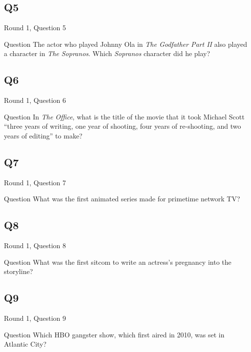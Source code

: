 \documentclass[11pt]{beamer}
\begin{document}
\subsection*{Q5}
\begin{frame}[t]{Round 1, Question 5}
\begin{block}{Question}
The actor who played Johnny Ola in \emph{The Godfather Part II} also played a character in \emph{The Sopranos}. Which \emph{Sopranos} character did he play?
\end{block}
\end{frame}
\subsection*{Q6}
\begin{frame}[t]{Round 1, Question 6}
\begin{block}{Question}
In \emph{The Office}, what is the title of the movie that it took Michael Scott ``three years of writing, one year of shooting, four years of re-shooting, and two years of editing'' to make?
\end{block}
\end{frame}
\subsection*{Q7}
\begin{frame}[t]{Round 1, Question 7}
\begin{block}{Question}
What was the first animated series made for primetime network TV\@?
\end{block}
\end{frame}
\subsection*{Q8}
\begin{frame}[t]{Round 1, Question 8}
\begin{block}{Question}
What was the first sitcom to write an actress's pregnancy into the storyline?
\end{block}
\end{frame}
\subsection*{Q9}
\begin{frame}[t]{Round 1, Question 9}
\begin{block}{Question}
Which HBO gangster show, which first aired in 2010, was set in Atlantic City?
\end{block}
\end{frame}
\end{document}

